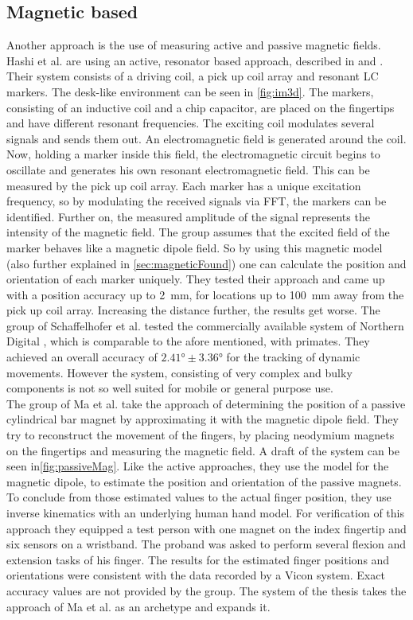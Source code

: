 \subsection{Magnetic based} \label{subsec:approaches:magnetic}
Another approach is the use of measuring active and passive magnetic fields.\\
Hashi et al. are using an active, resonator based approach, described in \cite{hashi2006wireless} and \cite{huang2014im3d}. Their system consists of a driving coil, a pick up coil array and resonant LC markers. The desk-like environment can be seen in \ref{fig:im3d}. The markers, consisting of an inductive coil and a chip capacitor, are placed on the fingertips and have different resonant frequencies. The exciting coil modulates several signals and sends them out. An electromagnetic field is generated around the coil. Now, holding a marker inside this field, the electromagnetic circuit begins to oscillate and generates his own resonant electromagnetic field. This can be measured by the pick up coil array. Each marker has a unique excitation frequency, so by modulating the received signals via FFT, the markers can be identified. Further on, the measured amplitude of the signal represents the intensity of the magnetic field. The group assumes that the excited field of the marker behaves like a magnetic dipole field. So by using this magnetic model (also further explained in \ref{sec:magneticFound}) one can calculate the position and orientation of each marker uniquely. They tested their approach and came up with a position accuracy up to \SI{2}{\mm}, for locations up to \SI{100}{mm} away from the pick up coil array. Increasing the distance further, the results get worse. The group of Schaffelhofer et al. tested the commercially available system of Northern Digital \cite{wave}, which is comparable to the afore mentioned, with primates. They achieved an overall accuracy of $ \ang{2.41} \pm \ang{3.36} $ for the tracking of dynamic movements. However the system, consisting of very complex and bulky components is not so well suited for mobile or general purpose use.\\
The group of Ma et al. take the approach of determining the position of a passive cylindrical bar magnet by approximating it with the magnetic dipole field. They try to reconstruct the movement of the fingers, by placing neodymium magnets on the fingertips and measuring the magnetic field. A draft of the system can be seen in\ref{fig:passiveMag}. Like the active approaches, they use the model for the magnetic dipole, to estimate the position and orientation of the passive magnets. To conclude from those estimated values to the actual finger position, they use inverse kinematics with an underlying human hand model. For verification of this approach they equipped a test person with one magnet on the index fingertip and six sensors on a wristband. The proband was asked to perform several flexion and extension tasks of his finger. The results for the estimated finger positions and orientations were consistent with the data recorded by a Vicon system. Exact accuracy values are not provided by the group. The system of the thesis takes the approach of Ma et al. as an archetype and expands it.
